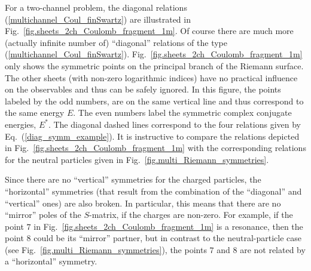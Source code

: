 \documentclass[12pt]{article}
\begin{document}
For a two-channel problem, the diagonal relations 
(\ref{multichannel_Coul_finSwartz}) are illustrated in 
Fig.~\ref{fig.sheets_2ch_Coulomb_fragment_1m}. Of course there are much more 
(actually infinite number of) ``diagonal'' relations of the type 
(\ref{multichannel_Coul_finSwartz}). 
Fig.~\ref{fig.sheets_2ch_Coulomb_fragment_1m} 
only shows the symmetric points on the principal branch of the Riemann surface. 
The other sheets (with non-zero logarithmic indices) have no practical 
influence 
on the observables and thus can be safely ignored. In this figure, the points 
labeled by the odd numbers, are on the same vertical line and thus correspond 
to the same energy $E$. The even numbers label the symmetric complex conjugate 
energies, $E^*$. The diagonal dashed lines correspond to the four 
relations given by Eq.~(\ref{diag_symm_example}).
It is instructive to compare the 
relations depicted in Fig.~\ref{fig.sheets_2ch_Coulomb_fragment_1m} with the 
corresponding relations for the neutral particles given in 
Fig.~\ref{fig.multi_Riemann_symmetries}.

Since there are no ``vertical'' symmetries for the charged particles, the 
``horizontal'' symmetries (that result from the combination of the 
``diagonal'' and ``vertical'' ones) are also broken. In particular, this means 
that there are no ``mirror'' poles of the $S$-matrix, if the charges are 
non-zero. For example, if the point $7$ in 
Fig.~\ref{fig.sheets_2ch_Coulomb_fragment_1m} is a resonance, then the point 
$8$ could be its ``mirror'' partner, but in contrast to the neutral-particle 
case (see Fig.~\ref{fig.multi_Riemann_symmetries}), the points $7$ and $8$ are 
not related by a ``horizontal'' symmetry.
\end{document}
